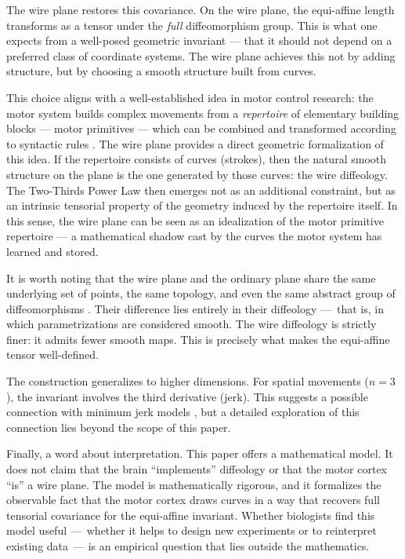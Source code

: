 \documentclass[10pt,letterpaper,reqno]{amsart}
\begin{document}
  The wire plane restores this covariance.
  On the wire plane,
  the equi-affine length transforms as a tensor under the \emph{full} diffeomorphism group.
  This is what one expects from a well-posed geometric invariant ---
  that it should not depend on a preferred class of coordinate systems.
  The wire plane achieves this not by adding structure,
  but by choosing a smooth structure built from curves.
  
  This choice aligns with a well-established idea in motor control research:
  the motor system builds complex movements from a \emph{repertoire} of elementary building blocks
  --- motor primitives ---
  which can be combined and transformed according to syntactic rules \cite{FH05,Flash21}.
  The wire plane provides a direct geometric formalization of this idea.
  If the repertoire consists of curves (strokes),
  then the natural smooth structure on the plane is the one generated by those curves: the wire diffeology.
  The Two-Thirds Power Law then emerges not as an additional constraint,
  but as an intrinsic tensorial property of the geometry induced by the repertoire itself.
  In this sense,
  the wire plane can be seen as an idealization of the motor primitive repertoire
  --- a mathematical shadow cast by the curves the motor system has learned and stored.
  
  It is worth noting that the wire plane and the ordinary plane share the same underlying set of points,
  the same topology,
  and even the same abstract group of diffeomorphisms \cite{PIZ26}.
  Their difference lies entirely in their diffeology
  ---~that is, in which parametrizations are considered smooth.
  The wire diffeology is strictly finer:
  it admits fewer smooth maps.
  This is precisely what makes the equi-affine tensor well-defined.
  
  The construction generalizes to higher dimensions.
  For spatial movements ($n = 3$),
  the invariant involves the third derivative (jerk).
  This suggests a possible connection with minimum jerk models \cite{FH85},
  but a detailed exploration of this connection lies beyond the scope of this paper.
  
  Finally,
  a word about interpretation.
  This paper offers a mathematical model.
  It does not claim that the brain ``implements'' diffeology or that the motor cortex ``is'' a wire plane.
  The model is mathematically rigorous,
  and it formalizes the observable fact that the motor cortex draws curves
  in a way that recovers full tensorial covariance for the equi-affine invariant.
  Whether biologists find this model useful
  ---~whether it helps to design new experiments or to reinterpret existing data~---
  is an empirical question that lies outside the mathematics.
  
\end{document}
